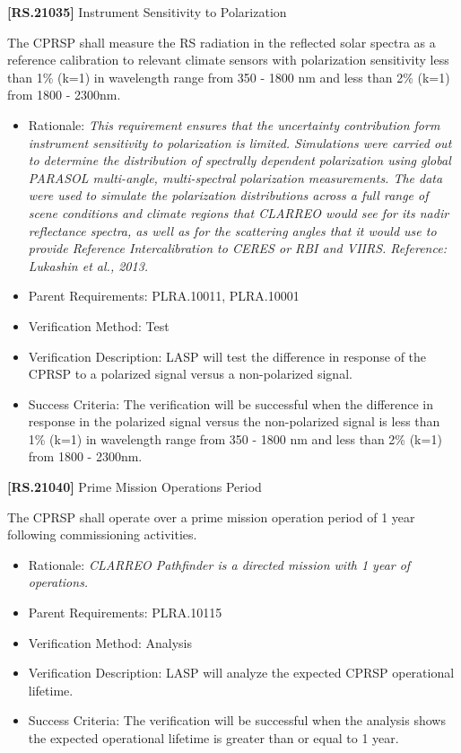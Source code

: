 \documentclass[12pt,oneside,oldfontcommands]{memoir}
\begin{document}
\textbf{[RS.21035]} Instrument Sensitivity to Polarization

The \gls{CPRSP} shall \gls{measure} the \gls{RS} radiation in the reflected solar spectra as a reference calibration to relevant climate sensors with polarization sensitivity less than 1\% (k=1) in wavelength range from 350 - 1800 nm and less than 2\% (k=1) from 1800 - 2300nm.

\begin{itemize}
\item{} Rationale: \emph{This requirement ensures that the uncertainty contribution form instrument sensitivity to polarization is limited. Simulations were carried out to determine the distribution of spectrally dependent polarization using global PARASOL multi-angle, multi-spectral polarization measurements. The data were used to simulate the polarization distributions across a full range of scene conditions and climate regions that CLARREO would see for its nadir reflectance spectra, as well as for the scattering angles that it would use to provide Reference Intercalibration to CERES or RBI and VIIRS. Reference: Lukashin et al., 2013.}

\item{} Parent Requirements: PLRA.10011, PLRA.10001

\item{} Verification Method: Test

\item{} Verification Description: \gls{LASP} will \gls{test} the difference in response of the \gls{CPRSP} to a polarized signal versus a non-polarized signal.

\item{} Success Criteria: The verification will be successful when the difference in response in the polarized signal versus the non-polarized signal is less than 1\% (k=1) in wavelength range from 350 - 1800 nm and less than 2\% (k=1) from 1800 - 2300nm.

\end{itemize}

\textbf{[RS.21040]} Prime Mission Operations Period

The \gls{CPRSP} shall operate over a prime mission operation period of 1 year following commissioning activities.

\begin{itemize}
\item{} Rationale: \emph{CLARREO Pathfinder is a directed mission with 1 year of operations.}

\item{} Parent Requirements: PLRA.10115

\item{} Verification Method: Analysis

\item{} Verification Description: \gls{LASP} will analyze the expected \gls{CPRSP} operational lifetime.

\item{} Success Criteria: The verification will be successful when the \gls{analysis} shows the expected operational lifetime is greater than or equal to 1 year.

\end{itemize}
\end{document}
